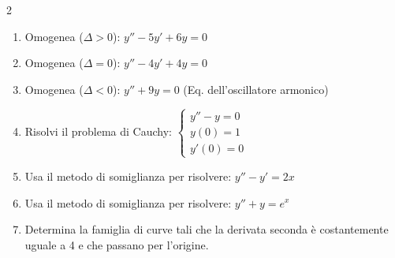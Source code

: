 \begin{multicols}{2}
\begin{enumerate}
    \item {} Omogenea ($\Delta > 0$): $y'' - 5y' + 6y = 0$
    \item {} Omogenea ($\Delta = 0$): $y'' - 4y' + 4y = 0$
    \item {} Omogenea ($\Delta < 0$): $y'' + 9y = 0$ (Eq. dell'oscillatore armonico)
    \item {} Risolvi il problema di Cauchy: $\begin{cases} y'' - y = 0 \\ y(0) = 1 \\ y'(0) = 0 \end{cases}$
    \item {} Usa il metodo di somiglianza per risolvere: $y'' - y' = 2x$
    \item {} Usa il metodo di somiglianza per risolvere: $y'' + y = e^x$
    \item {} Determina la famiglia di curve tali che la derivata seconda è costantemente uguale a 4 e che passano per l'origine.
\end{enumerate}
\end{multicols}
